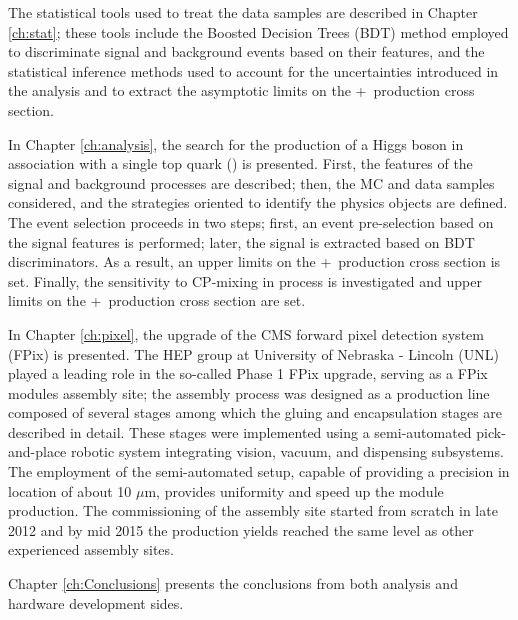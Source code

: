 The statistical tools used to treat the data samples are described in Chapter \ref{ch:stat}; these tools include the Boosted Decision Trees (BDT) method employed to discriminate signal and background events based on their features, and the statistical inference methods used to account for the uncertainties introduced in the analysis and to extract the asymptotic limits on the \tH+\ttH\ production cross section. 


In Chapter \ref{ch:analysis}, the search for the production of a Higgs boson in association with a single top quark (\tH) is presented. First, the features of the signal and background processes are described; then, the MC and data samples considered, and the strategies oriented to identify the physics objects are defined. The event selection proceeds in two steps; first, an event pre-selection based on the signal features is performed; later, the signal is extracted based on BDT discriminators. As a result, an upper limits on the \tH+\ttH\ production cross section is set. Finally, the  sensitivity to CP-mixing in \tH process is investigated and upper limits on the \tH+\ttH\ production cross section are set.   

In Chapter \ref{ch:pixel}, the upgrade of the CMS forward pixel detection system (FPix) is presented. The HEP group at University of Nebraska - Lincoln (UNL) played a leading role in the so-called Phase 1 FPix upgrade, serving as a FPix modules assembly site; the assembly process was designed as a production line composed of several stages among which the gluing and encapsulation stages are described in detail. These stages were implemented using a semi-automated pick-and-place robotic system integrating vision, vacuum, and dispensing subsystems. The employment of the semi-automated setup, capable of providing a precision in location of about 10 $\mu$m, provides uniformity and speed up the module production. The commissioning of the assembly site started from scratch in late 2012 and by mid 2015 the production yields reached the same level as other experienced assembly sites.

Chapter \ref{ch:Conclusions} presents the conclusions from both analysis and hardware development sides.

